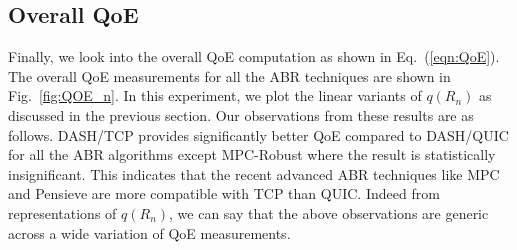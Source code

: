 \subsection{Overall QoE}
Finally, we look into the overall QoE computation as shown in Eq.~(\ref{eqn:QoE}). The overall QoE measurements for  all the ABR techniques are shown in Fig.~\ref{fig:QOE_n}. In this experiment, we plot the linear variants of $q(R_n)$ as discussed in the previous section. Our observations from these results are as follows. DASH/TCP provides significantly better QoE compared to DASH/QUIC for all the ABR algorithms except MPC-Robust where the result is statistically insignificant. This indicates that the recent advanced ABR techniques like MPC and Pensieve are more compatible with TCP than QUIC. Indeed from representations of $q(R_n)$, we can say that the above observations are generic across a wide variation of QoE measurements. 


